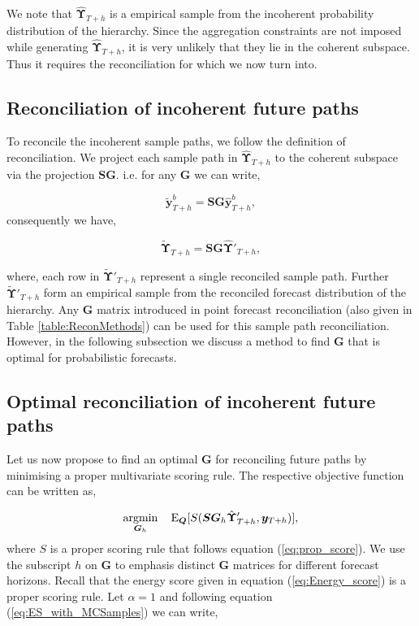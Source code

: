 \documentclass[12pt]{article}
\def\E{\text{E}}
\theoremstyle{definition}
\begin{document}
We note that $\hat{\bm{\Upsilon}}_{T+h}$ is a empirical sample from the incoherent probability distribution of the hierarchy. Since the aggregation constraints are not imposed while generating $\hat{\bm{\Upsilon}}_{T+h}$, it is very unlikely that they lie in the coherent subspace. Thus it requires the reconciliation for which we now turn into. 

\subsection{Reconciliation of incoherent future paths}

To reconcile the incoherent sample paths, we follow the definition of reconciliation. We project each sample path in $\hat{\bm{\Upsilon}}_{T+h}$ to the coherent subspace via the projection $\bm{SG}$. i.e. for any $\bm{G}$ we can write, 

\begin{equation} \label{eq:sampleRecon_1}
\tilde{\bm{y}}_{T+h}^b = \bm{SG}\hat{\bm{y}}_{T+h}^b,
\end{equation} 
consequently we have, 

\begin{equation} \label{eq:sampleRecon_2}
\tilde{\bm{\Upsilon}}_{T+h} = \bm{SG}\hat{\bm{\Upsilon}}'_{T+h},
\end{equation} 

where, each row in $\tilde{\bm{\Upsilon}}'_{T+h}$ represent a single reconciled sample path. Further $\tilde{\bm{\Upsilon}}'_{T+h}$ form an empirical sample from the reconciled forecast distribution of the hierarchy. Any $\bm{G}$ matrix introduced in point forecast reconciliation (also given in Table \ref{table:ReconMethods}) can be used for this sample path reconciliation. However, in the following subsection we discuss a method to find $\bm{G}$ that is optimal for probabilistic forecasts. 

\subsection{Optimal reconciliation of incoherent future paths}\label{subsec:Optimal_recon}

Let us now propose to find an optimal $\bm{G}$ for reconciling future paths by minimising a proper multivariate scoring rule. The respective objective function can be written as, 

\begin{equation} \label{eq:Obj_func_1}
\operatornamewithlimits{argmin}_{\bm{G}_h} \quad \E_{\bm{Q}}[S(\bm{SG}_h\hat{\bm{\Upsilon}}'_{T+h}, \bm{y}_{T+h})],
\end{equation}
where $S$ is a proper scoring rule that follows equation (\ref{eq:prop_score}). We use the subscript $h$ on $\bm{G}$ to emphasis distinct $\bm{G}$ matrices for different forecast horizons. Recall that the energy score given in equation (\ref{eq:Energy_score}) is a proper scoring rule. Let $\alpha = 1$ and following equation (\ref{eq:ES_with_MCSamples}) we can write,  
\end{document}
